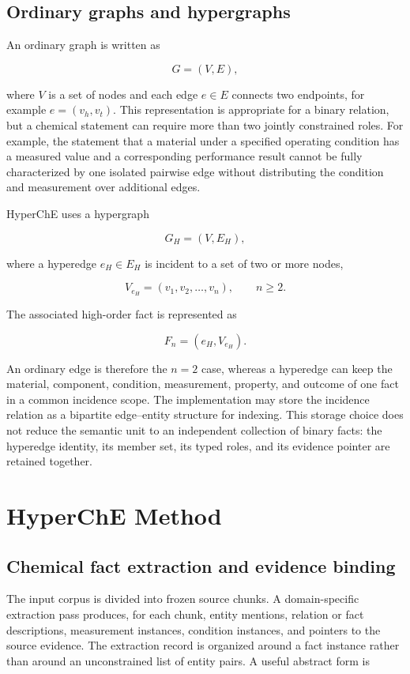 \subsection{Ordinary graphs and hypergraphs}

An ordinary graph is written as

\[
G=(V,E),
\]

where $V$ is a set of nodes and each edge $e\in E$ connects two endpoints, for example $e=(v_h,v_t)$. This representation is appropriate for a binary relation, but a chemical statement can require more than two jointly constrained roles. For example, the statement that a material under a specified operating condition has a measured value and a corresponding performance result cannot be fully characterized by one isolated pairwise edge without distributing the condition and measurement over additional edges.

HyperChE uses a hypergraph

\[
G_H=(V,E_H),
\]

where a hyperedge $e_H\in E_H$ is incident to a set of two or more nodes,

\[
V_{e_H}=(v_1,v_2,\ldots,v_n),\qquad n\geq 2.
\]

The associated high-order fact is represented as

\[
F_n=(e_H,V_{e_H}).
\]

An ordinary edge is therefore the $n=2$ case, whereas a hyperedge can keep the material, component, condition, measurement, property, and outcome of one fact in a common incidence scope. The implementation may store the incidence relation as a bipartite edge--entity structure for indexing. This storage choice does not reduce the semantic unit to an independent collection of binary facts: the hyperedge identity, its member set, its typed roles, and its evidence pointer are retained together.

\section{HyperChE Method}

\subsection{Chemical fact extraction and evidence binding}

The input corpus is divided into frozen source chunks. A domain-specific extraction pass produces, for each chunk, entity mentions, relation or fact descriptions, measurement instances, condition instances, and pointers to the source evidence. The extraction record is organized around a fact instance rather than around an unconstrained list of entity pairs. A useful abstract form is

